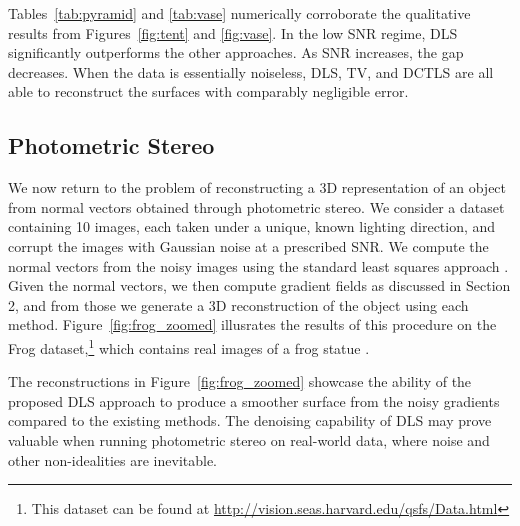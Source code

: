 \vspace{-2mm}
Tables~\ref{tab:pyramid} and \ref{tab:vase} numerically corroborate the qualitative results from Figures~\ref{fig:tent} and \ref{fig:vase}. In the low SNR regime, DLS significantly outperforms the other approaches. As SNR increases, the gap decreases. When the data is essentially noiseless, DLS, TV, and DCTLS are all able to reconstruct the surfaces with comparably negligible error.


\subsection{Photometric Stereo}
We now return to the problem of reconstructing a 3D representation of an object from normal vectors obtained through photometric stereo. We consider a dataset containing 10 images, each taken under a unique, known lighting direction, and corrupt the images with Gaussian noise at a prescribed SNR. We compute the normal vectors from the noisy images using the standard least squares approach \cite{wu2011}. Given the normal vectors, we then compute gradient fields as discussed in Section 2, and from those we generate a 3D reconstruction of the object using each method. Figure~\ref{fig:frog_zoomed} illusrates the results of this procedure on the Frog dataset,\footnote{This dataset can be found at \url{http://vision.seas.harvard.edu/qsfs/Data.html}} which contains real images of a frog statue \cite{xiong2015shading}.

The reconstructions in Figure~\ref{fig:frog_zoomed} showcase the ability of the proposed DLS approach to produce a smoother surface from the noisy gradients compared to the existing methods. The denoising capability of DLS may prove valuable when running photometric stereo on real-world data, where noise and other non-idealities are inevitable.



